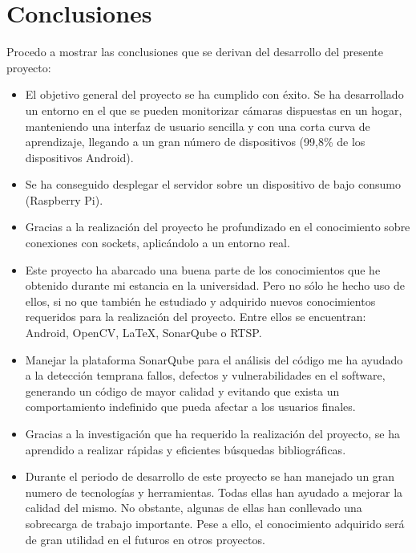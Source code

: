 
\section{Conclusiones}

Procedo a mostrar las conclusiones que se derivan del desarrollo del presente proyecto:

\begin{itemize}
\tightlist
\item
  El objetivo general del proyecto se ha cumplido con éxito. Se ha desarrollado un entorno en el que se pueden monitorizar cámaras dispuestas en un hogar, manteniendo una interfaz de usuario sencilla y con una corta curva de aprendizaje, llegando a un gran número de dispositivos (99,8\% de los dispositivos Android).
\item
  Se ha conseguido desplegar el servidor sobre un dispositivo de bajo consumo (Raspberry Pi).
\item
  Gracias a la realización del proyecto he profundizado en el conocimiento sobre conexiones con sockets, aplicándolo a un entorno real.
\item
  Este proyecto ha abarcado una buena parte de los conocimientos que he obtenido durante mi estancia en la universidad. Pero no sólo he hecho uso de ellos, si no que también he estudiado y adquirido nuevos conocimientos requeridos para la realización del proyecto. Entre ellos se encuentran: Android, OpenCV, \LaTeX , SonarQube o RTSP.
\item
  Manejar la plataforma SonarQube para el análisis del código me ha ayudado a la detección temprana fallos, defectos y vulnerabilidades en el software, generando un código de mayor calidad y evitando que exista un comportamiento indefinido que pueda afectar a los usuarios finales.
\item
  Gracias a la investigación que ha requerido la realización del proyecto, se ha aprendido
a realizar rápidas y eficientes búsquedas bibliográficas.
\item
  Durante el periodo de desarrollo de este proyecto se han manejado un gran numero de tecnologías y herramientas. Todas ellas han ayudado a mejorar la calidad del mismo.
No obstante, algunas de ellas han conllevado una sobrecarga de trabajo importante. 
Pese a ello, el conocimiento adquirido será de gran utilidad en el futuros en otros proyectos.

\end{itemize}



